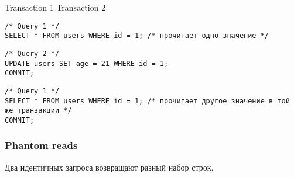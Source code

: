 \begin{minipage}{.5\linewidth}
\hfil Transaction 1 \hfil   \hfil Transaction 2 \hfil

\begin{flushleft}\begin{minipage}{.6\textwidth}
\begin{verbatim}
/* Query 1 */
SELECT * FROM users WHERE id = 1; /* прочитает одно значение */
\end{verbatim}
\end{minipage}\end{flushleft}

\begin{flushright}\begin{minipage}{.6\textwidth}
\begin{verbatim}
/* Query 2 */
UPDATE users SET age = 21 WHERE id = 1;
COMMIT;
\end{verbatim}
\end{minipage}
\end{flushright}

\begin{flushleft}\begin{minipage}{.6\textwidth}
\begin{verbatim}
/* Query 1 */
SELECT * FROM users WHERE id = 1; /* прочитает другое значение в той же транзакции */
COMMIT;
\end{verbatim}
\end{minipage}\end{flushleft}
\end{minipage}

\subsubsection{Phantom reads}
Два идентичных запроса возвращают разный набор строк.

